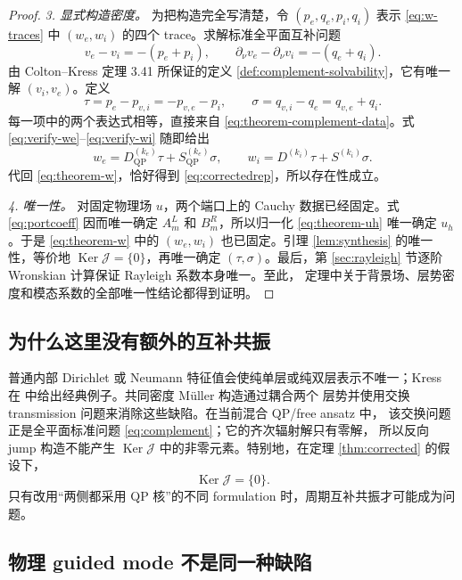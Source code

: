 \documentclass[UTF8,11pt,fontset=fandol]{ctexart}
\newcommand{\QP}{\mathrm{QP}}
\newcommand{\Ker}{\operatorname{Ker}}
\theoremstyle{plain}
\theoremstyle{definition}
\theoremstyle{remark}
\begin{document}
\begin{proof}
\emph{3. 显式构造密度。}
为把构造完全写清楚，令 \((p_e,q_e,p_i,q_i)\) 表示
\eqref{eq:w-traces} 中 \((w_e,w_i)\) 的四个 trace。求解标准全平面互补问题
\begin{equation}
v_e-v_i=-(p_e+p_i),\qquad
\partial_\nu v_e-\partial_\nu v_i=-(q_e+q_i).
\label{eq:theorem-complement-data}
\end{equation}
由 Colton--Kress 定理 3.41 所保证的定义
\ref{def:complement-solvability}，它有唯一解 \((v_i,v_e)\)。定义
\begin{equation}
\tau=p_e-p_{v,i}=-p_{v,e}-p_i,\qquad
\sigma=q_{v,i}-q_e=q_{v,e}+q_i.
\label{eq:theorem-densities}
\end{equation}
每一项中的两个表达式相等，直接来自
\eqref{eq:theorem-complement-data}。式
\eqref{eq:verify-we}--\eqref{eq:verify-wi} 随即给出
\[
w_e=D_{\QP}^{(k_e)}\tau+S_{\QP}^{(k_e)}\sigma,
\qquad
w_i=D^{(k_i)}\tau+S^{(k_i)}\sigma.
\]
代回 \eqref{eq:theorem-w}，恰好得到 \eqref{eq:correctedrep}，所以存在性成立。

\emph{4. 唯一性。}
对固定物理场 \(u\)，两个端口上的 Cauchy 数据已经固定。式
\eqref{eq:portcoeff} 因而唯一确定 \(A_m^L\) 和 \(B_m^R\)，所以归一化
\eqref{eq:theorem-uh} 唯一确定 \(u_h\)。于是 \eqref{eq:theorem-w} 中的
\((w_e,w_i)\) 也已固定。引理 \ref{lem:synthesis} 的唯一性，等价地
\(\Ker\mathcal J=\{0\}\)，再唯一确定 \((\tau,\sigma)\)。最后，第
\ref{sec:rayleigh} 节逐阶 Wronskian 计算保证 Rayleigh 系数本身唯一。至此，
定理中关于背景场、层势密度和模态系数的全部唯一性结论都得到证明。
\end{proof}

\subsection{为什么这里没有额外的互补共振}

普通内部 Dirichlet 或 Neumann 特征值会使纯单层或纯双层表示不唯一；Kress 在
\cite[第 1 节]{Kress1991} 中给出经典例子。共同密度 Müller 构造通过耦合两个
层势并使用交换 transmission 问题来消除这些缺陷。在当前混合 QP/free ansatz 中，
该交换问题正是全平面标准问题 \eqref{eq:complement}；它的齐次辐射解只有零解，
所以反向 jump 构造不能产生 \(\Ker\mathcal J\) 中的非零元素。特别地，在定理
\ref{thm:corrected} 的假设下，
\[
\Ker\mathcal J=\{0\}.
\]
只有改用“两侧都采用 QP 核”的不同 formulation 时，周期互补共振才可能成为问题。

\subsection{物理 guided mode 不是同一种缺陷}
\end{document}
